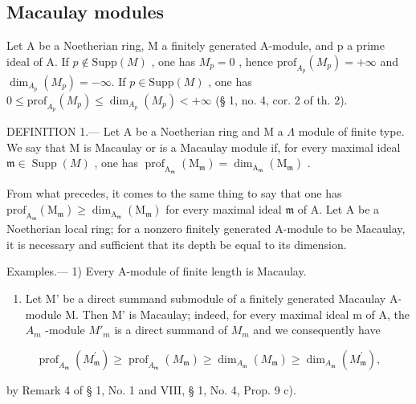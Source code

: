 \subsection{Macaulay modules}

Let A be a Noetherian ring, M a finitely generated A-module, and p a prime ideal of A. If \(p \notin \text{Supp}(M)\) , one has \(M_{p} = 0\) , hence \(\text{prof}_{A_{p}}(M_{p}) = +\infty\) and \(\dim_{A_{p}}(M_{p}) = -\infty\). If \(p \in \text{Supp}(M)\) , one has \(0 \leqslant \text{prof}_{A_{p}}(M_{p}) \leqslant \dim_{A_{p}}(M_{p}) < +\infty\) (§ 1, no. 4, cor. 2 of th. 2).

DEFINITION 1.--- Let A be a Noetherian ring and M a \(\Lambda\) module of finite type. We say that M is Macaulay or is a Macaulay module if, for every maximal ideal \(\mathfrak{m} \in \operatorname{Supp}(M)\) , one has \(\operatorname{prof}_{\mathrm{A}_{\mathfrak{m}}}\left(\mathrm{M}_{\mathfrak{m}}\right) = \dim_{\mathrm{A}_{\mathfrak{m}}}\left(\mathrm{M}_{\mathfrak{m}}\right)\) .

From what precedes, it comes to the same thing to say that one has \(\mathrm{prof}_{\mathrm{A}_{\mathfrak{m}}}\left(\mathrm{M}_{\mathfrak{m}}\right) \geqslant \dim_{\mathrm{A}_{\mathfrak{m}}}\left(\mathrm{M}_{\mathfrak{m}}\right)\) for every maximal ideal \(\mathfrak{m}\) of A. Let A be a Noetherian local ring; for a nonzero finitely generated A-module to be Macaulay, it is necessary and sufficient that its depth be equal to its dimension.

Examples.--- 1) Every A-module of finite length is Macaulay.

\begin{enumerate}
\def\labelenumi{\arabic{enumi})}
\setcounter{enumi}{1}
\tightlist
\item
  Let M' be a direct summand submodule of a finitely generated Macaulay A-module M. Then M' is Macaulay; indeed, for every maximal ideal m of A, the \(A_{m}\) -module \(M'_{m}\) is a direct summand of \(M_{m}\) and we consequently have
\end{enumerate}

\[
\operatorname{prof} _ {A _ {\mathfrak {m}}} \left(M _ {\mathfrak {m}} ^ {\prime}\right) \geqslant \operatorname{prof} _ {A _ {\mathfrak {m}}} \left(M _ {\mathfrak {m}}\right) \geqslant \dim_ {A _ {\mathfrak {m}}} \left(M _ {\mathfrak {m}}\right) \geqslant \dim_ {A _ {\mathfrak {m}}} \left(M _ {\mathfrak {m}} ^ {\prime}\right),
\]

by Remark 4 of § 1, No. 1 and VIII, § 1, No. 4, Prop. 9 c).

